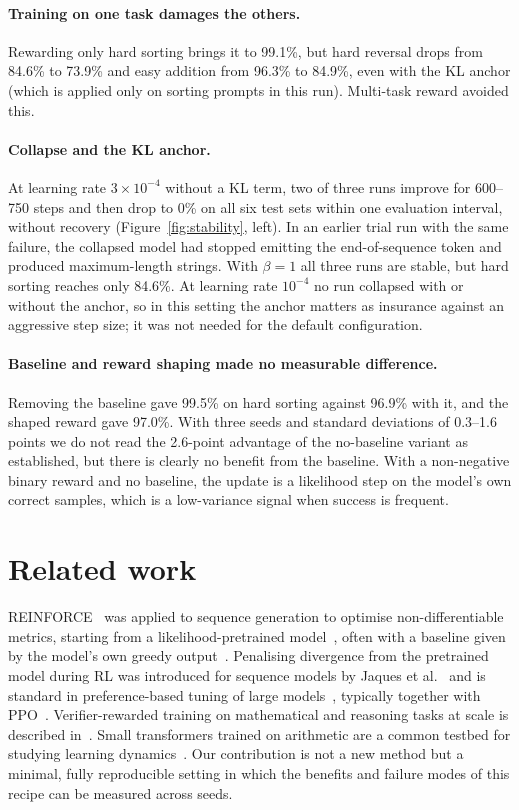 \documentclass[10pt,twocolumn]{article}
\begin{document}
\paragraph{Training on one task damages the others.}
Rewarding only hard sorting brings it to 99.1\%, but hard reversal drops from 84.6\% to 73.9\% and
easy addition from 96.3\% to 84.9\%, even with the KL anchor (which is applied only on sorting
prompts in this run). Multi-task reward avoided this.

\paragraph{Collapse and the KL anchor.}
At learning rate $3\times10^{-4}$ without a KL term, two of three runs improve for 600--750 steps
and then drop to 0\% on all six test sets within one evaluation interval, without recovery
(Figure~\ref{fig:stability}, left). In an earlier trial run with the same failure, the collapsed
model had stopped emitting the end-of-sequence token and produced maximum-length strings. With
$\beta=1$ all three runs are stable, but hard sorting reaches only 84.6\%. At learning rate
$10^{-4}$ no run collapsed with or without the anchor, so in this setting the anchor matters as
insurance against an aggressive step size; it was not needed for the default configuration.

\paragraph{Baseline and reward shaping made no measurable difference.}
Removing the baseline gave 99.5\% on hard sorting against 96.9\% with it, and the shaped reward
gave 97.0\%. With three seeds and standard deviations of 0.3--1.6 points we do not read the
2.6-point advantage of the no-baseline variant as established, but there is clearly no benefit from
the baseline. With a non-negative binary reward and no baseline, the update is a likelihood step on
the model's own correct samples, which is a low-variance signal when success is frequent.

\section{Related work}
REINFORCE~\cite{williams1992} was applied to sequence generation to optimise non-differentiable
metrics, starting from a likelihood-pretrained model~\cite{ranzato2016}, often with a baseline given
by the model's own greedy output~\cite{rennie2017}. Penalising divergence from the pretrained model
during RL was introduced for sequence models by Jaques et al.~\cite{jaques2017} and is standard in
preference-based tuning of large models~\cite{ouyang2022}, typically together with
PPO~\cite{schulman2017}. Verifier-rewarded training on mathematical and reasoning tasks at scale is
described in~\cite{shao2024,guo2025}. Small transformers trained on arithmetic are a common testbed
for studying learning dynamics~\cite{lee2024}. Our contribution is not a new method but a minimal,
fully reproducible setting in which the benefits and failure modes of this recipe can be measured
across seeds.
\end{document}
